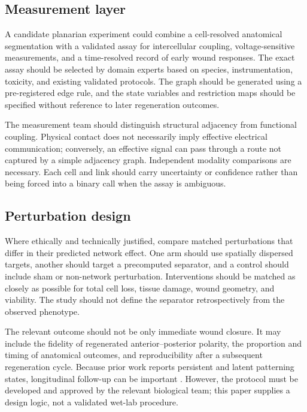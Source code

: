 \documentclass[12pt,a4paper]{article}
\begin{document}
\subsection{Measurement layer}
A candidate planarian experiment could combine a cell-resolved anatomical segmentation with a validated assay for intercellular coupling, voltage-sensitive measurements, and a time-resolved record of early wound responses. The exact assay should be selected by domain experts based on species, instrumentation, toxicity, and existing validated protocols. The graph should be generated using a pre-registered edge rule, and the state variables and restriction maps should be specified without reference to later regeneration outcomes.

The measurement team should distinguish structural adjacency from functional coupling. Physical contact does not necessarily imply effective electrical communication; conversely, an effective signal can pass through a route not captured by a simple adjacency graph. Independent modality comparisons are necessary. Each cell and link should carry uncertainty or confidence rather than being forced into a binary call when the assay is ambiguous.

\subsection{Perturbation design}
Where ethically and technically justified, compare matched perturbations that differ in their predicted network effect. One arm should use spatially dispersed targets, another should target a precomputed separator, and a control should include sham or non-network perturbation. Interventions should be matched as closely as possible for total cell loss, tissue damage, wound geometry, and viability. The study should not define the separator retrospectively from the observed phenotype.

The relevant outcome should not be only immediate wound closure. It may include the fidelity of regenerated anterior--posterior polarity, the proportion and timing of anatomical outcomes, and reproducibility after a subsequent regeneration cycle. Because prior work reports persistent and latent patterning states, longitudinal follow-up can be important \citep{Durant2017,Durant2019}. However, the protocol must be developed and approved by the relevant biological team; this paper supplies a design logic, not a validated wet-lab procedure.
\end{document}
